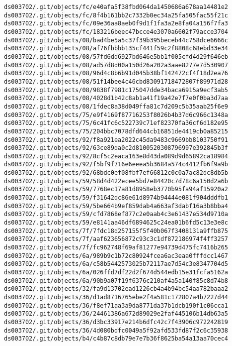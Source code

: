 \documentclass[11pt]{article}
\begin{document}
\begin{Verbatim}[commandchars=\\\{\}]
ds003702/.git/objects/fc/e40afa5f38fbd064da1450686a678aa14481e2
ds003702/.git/objects/fc/8f4b161bb2c7332b0ec34a25fa505fac55f21c
ds003702/.git/objects/fc/09e36aa8aeb0f9d1f1fa3a2e8fa04a156f7fa3
ds003702/.git/objects/fc/183216beec47bcce4e3070a6602f79acce3704
ds003702/.git/objects/08/bad4be5a5c37f39b395beceb44c758dce6666c
ds003702/.git/objects/08/af76fbbbb135cf441f59c2f8808c68ebd33e34
ds003702/.git/objects/08/57fd6dd6927bd646e5bb1f005cfd4d29f646eb
ds003702/.git/objects/08/ad57d8d00a150d26a202a3aae8277e7d530907
ds003702/.git/objects/08/96d4c8b6b91d045b38bf142472cf4f18d2ea76
ds003702/.git/objects/08/51f14bee4c46cbd83091718472807f89971d28
ds003702/.git/objects/08/9838f7981c175047dde34baca6915a9ecf3ab5
ds003702/.git/objects/08/4028d1b42c8ab1a41f19a42e7f7e0f0ba3d7aa
ds003702/.git/objects/08/1fdec8a38d049ffa81c7d209c5b35aab25f6e9
ds003702/.git/objects/75/e9f4169f87716253f8026b4b37d6c966c1348a
ds003702/.git/objects/75/6c41fc6c522739c71ef82370fa36cf6d182e95
ds003702/.git/objects/75/204bbc7078dfd644cb16851de4419cb0a85215
ds003702/.git/objects/92/f8a921ea2022c45da9483c9669bb8103750f91
ds003702/.git/objects/92/63ce89da0c2d8100520308796997e392845b3f
ds003702/.git/objects/92/8cf5c2eaca163e8d43da089d9d65892ca18984
ds003702/.git/objects/92/f5bf9f716e6eeea5b3684a574c4412fb6f9a9b
ds003702/.git/objects/92/68bdc0ef08fbf7ef66812c0c0a7ac82dc8db5b
ds003702/.git/objects/59/58d4d422ecee5bd7e84420c7d78c6a150d2a6b
ds003702/.git/objects/59/7768ec17a81d8958eb3770b95fa94af15920a2
ds003702/.git/objects/59/f31642dc86e61d8974b94444e081f904dddfb1
ds003702/.git/objects/59/5be664b9ef859dab4a663af3dabf16a3b8bba4
ds003702/.git/objects/59/cfd7868ef877c2e0aab4c3e61437e534d9710a
ds003702/.git/objects/59/e8141aa46df6894625c24ea01b6fd5c13e3e8c
ds003702/.git/objects/7f/7fdc18d257155f5f40b067f3408131a9ffb875
ds003702/.git/objects/7f/aaf623656872c93c3c1df872186974f4ff3257
ds003702/.git/objects/7f/fc962748f69af81277e94739d475fc7416b265
ds003702/.git/objects/6a/989b9c1b72c80924fcea6ac3eaa0fffdcc1467
ds003702/.git/objects/6a/c58b5442573025b72117ae7d54c3e8347704d5
ds003702/.git/objects/6a/026ffd7df22d2f674d544edb15e31fcfa5162a
ds003702/.git/objects/6a/90b9a07f19f6376c210af4a5a140f85c8d74b8
ds003702/.git/objects/32/fa9d13702ead1226cb4a4b94bc54aa782baaa2
ds003702/.git/objects/36/d1ad8716765ebe2f4a581c172807a4b7227d44
ds003702/.git/objects/36/f8ef71aa3a9da8771da37b1dcb190f1c06cca1
ds003702/.git/objects/36/24461386a672d89029e2faf445106b14db63a5
ds003702/.git/objects/36/d3bc33917e214b6dfc42c7f43906c972242819
ds003702/.git/objects/36/4d080bdfc0049a5f92afd533fd87f2c6c35938
ds003702/.git/objects/b4/c4b87c8db79e7e7b36f8625ba54a13aa70cec4

\end{Verbatim}
\end{document}
